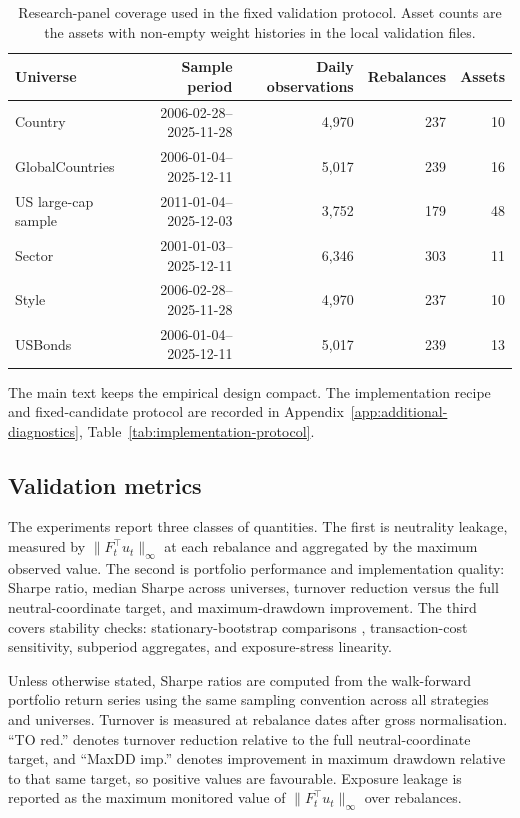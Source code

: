 \documentclass[11pt]{article}
\begin{document}
\begin{table}[!htbp]
\centering
\scriptsize
\begin{tabular}{lrrrr}
\toprule
Universe & Sample period & Daily observations & Rebalances & Assets \\
\midrule
Country & 2006-02-28--2025-11-28 & 4,970 & 237 & 10 \\
GlobalCountries & 2006-01-04--2025-12-11 & 5,017 & 239 & 16 \\
US large-cap sample & 2011-01-04--2025-12-03 & 3,752 & 179 & 48 \\
Sector & 2001-01-03--2025-12-11 & 6,346 & 303 & 11 \\
Style & 2006-02-28--2025-11-28 & 4,970 & 237 & 10 \\
USBonds & 2006-01-04--2025-12-11 & 5,017 & 239 & 13 \\
\bottomrule
\end{tabular}
\caption{Research-panel coverage used in the fixed validation protocol.  Asset counts are the assets with non-empty weight histories in the local validation files.}
\label{tab:panel-coverage}
\end{table}

The main text keeps the empirical design compact.  The implementation recipe and fixed-candidate
protocol are recorded in Appendix~\ref{app:additional-diagnostics},
Table~\ref{tab:implementation-protocol}.






\subsection{Validation metrics}

The experiments report three classes of quantities.  The first is neutrality leakage, measured by
$\|F_t^\top u_t\|_\infty$ at each rebalance and aggregated by the maximum observed value.  The second
is portfolio performance and implementation quality: Sharpe ratio, median Sharpe across universes,
turnover reduction versus the full neutral-coordinate target, and maximum-drawdown improvement.  The third covers stability checks:
stationary-bootstrap comparisons \citep{PolitisRomano1994}, transaction-cost sensitivity, subperiod
aggregates, and exposure-stress linearity.

Unless otherwise stated, Sharpe ratios are computed from the walk-forward portfolio return series using
the same sampling convention across all strategies and universes.  Turnover is measured at rebalance
dates after gross normalisation.  ``TO red.'' denotes turnover reduction relative to the full
neutral-coordinate target, and ``MaxDD imp.'' denotes improvement in maximum drawdown
relative to that same target, so positive values are favourable.  Exposure leakage is reported as the
maximum monitored value of $\|F_t^\top u_t\|_\infty$ over rebalances.
\end{document}
